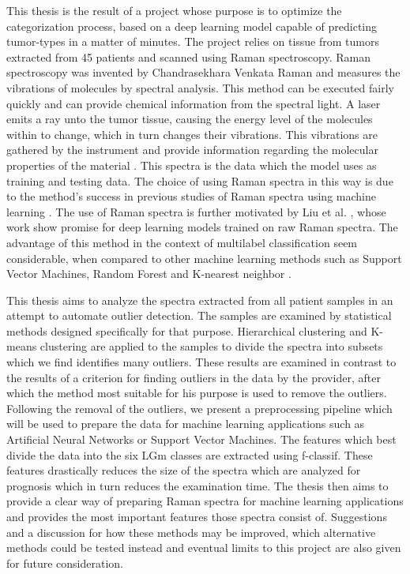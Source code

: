 This thesis is the result of a project whose purpose is to optimize the categorization process, based on a deep learning model capable of predicting tumor-types in a matter of minutes. The project relies on tissue from tumors extracted from 45 patients and scanned using Raman spectroscopy. Raman spectroscopy was invented by Chandrasekhara Venkata Raman and measures the vibrations of molecules by spectral analysis. This method can be executed fairly quickly and can provide chemical information from the spectral light. A laser emits a ray unto the tumor tissue, causing the energy level of the molecules within to change, which in turn changes their vibrations. This vibrations are gathered by the instrument and provide information regarding the molecular properties of the material \cite{long1977raman, graves1989practical}. This spectra is the data which the model uses as training and testing data. The choice of using Raman spectra in this way is due to the method's success in previous studies of Raman spectra using machine learning \cite{ramanDL, ho2019rapid}. The use of Raman spectra is further motivated by Liu et al. \cite{liu2017deep}, whose work show promise for deep learning models trained on raw Raman spectra. The advantage of this method in the context of multilabel classification seem considerable, when compared to other machine learning methods such as Support Vector Machines, Random Forest and K-nearest neighbor \cite{liu2017deep}.

This thesis aims to analyze the spectra extracted from all patient samples in an attempt to automate outlier detection. The samples are examined by statistical methods designed specifically for that purpose. Hierarchical clustering and K-means clustering are applied to the samples to divide the spectra into subsets which we find identifies many outliers. These results are examined in contrast to the results of a criterion for finding outliers in the data by the provider, after which the method most suitable for his purpose is used to remove the outliers. Following the removal of the outliers, we present a preprocessing pipeline which will be used to prepare the data for machine learning applications such as Artificial Neural Networks or Support Vector Machines. The features which best divide the data into the six LGm classes are extracted using f-classif. These features drastically reduces the size of the spectra which are analyzed for prognosis which in turn reduces the examination time. The thesis then aims to provide a clear way of preparing Raman spectra for machine learning applications and provides the most important features those spectra consist of. Suggestions and a discussion for how these methods may be improved, which alternative methods could be tested instead and eventual limits to this project are also given for future consideration.


